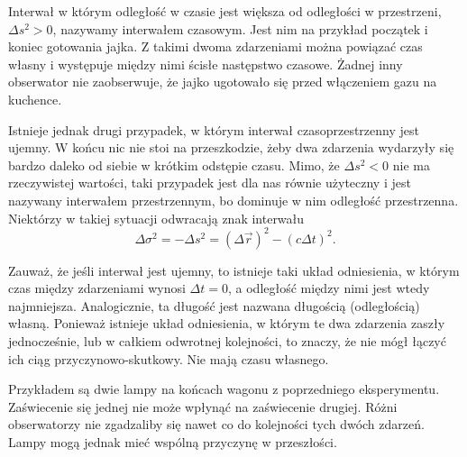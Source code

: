 \documentclass[10pt,twocolumn,fleqn,polish]{article}
\begin{document}
Interwał w którym odległość w czasie jest większa od odległości w
przestrzeni, $\Delta s^2 > 0$, nazywamy interwałem czasowym. Jest nim na przykład
początek i koniec gotowania jajka. Z takimi dwoma zdarzeniami można powiązać czas własny
i występuje między nimi ścisłe następstwo czasowe. Żadnej inny obserwator nie zaobserwuje, że jajko
ugotowało się przed włączeniem gazu na kuchence.

Istnieje jednak drugi przypadek, w którym interwał czasoprzestrzenny jest ujemny.
W końcu nic nie stoi na przeszkodzie, żeby dwa zdarzenia wydarzyły się bardzo daleko od
siebie w krótkim odstępie czasu.
Mimo, że $\Delta s^2 < 0$ nie ma rzeczywistej wartości, taki przypadek jest dla nas
równie użyteczny i jest nazywany interwałem przestrzennym, bo dominuje
w nim odległość przestrzenna.
Niektórzy w takiej sytuacji odwracają znak interwału
\[\Delta \sigma^2 = -\Delta s^2 = (\Delta \vec r)^2 - (c\Delta t)^2.\]

Zauważ, że jeśli interwał jest ujemny,
to istnieje taki układ odniesienia, w którym czas między zdarzeniami wynosi $\Delta t = 0$,
a odległość między nimi jest wtedy najmniejsza. Analogicznie, ta długość jest nazwana
długością (odległością) własną.
Ponieważ istnieje układ odniesienia, w którym te dwa zdarzenia
zaszły jednocześnie, lub w całkiem odwrotnej kolejności,
to znaczy, że nie mógł łączyć ich ciąg przyczynowo-skutkowy.
Nie mają czasu własnego.

Przykładem są dwie lampy na końcach wagonu z poprzedniego eksperymentu.
Zaświecenie się jednej nie może wpłynąć na zaświecenie drugiej.
Różni obserwatorzy nie zgadzaliby się nawet co do kolejności tych dwóch zdarzeń.
Lampy mogą jednak mieć wspólną przyczynę w przeszłości.
\newpage
\end{document}
